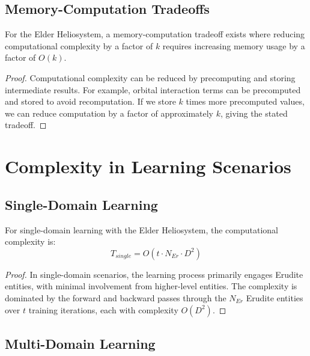 \subsection{Memory-Computation Tradeoffs}

\begin{theorem}
For the Elder Heliosystem, a memory-computation tradeoff exists where reducing computational complexity by a factor of $k$ requires increasing memory usage by a factor of $O(k)$.
\end{theorem}

\begin{proof}
Computational complexity can be reduced by precomputing and storing intermediate results. For example, orbital interaction terms can be precomputed and stored to avoid recomputation. If we store $k$ times more precomputed values, we can reduce computation by a factor of approximately $k$, giving the stated tradeoff.
\end{proof}

\section{Complexity in Learning Scenarios}

\subsection{Single-Domain Learning}

\begin{theorem}
For single-domain learning with the Elder Heliosystem, the computational complexity is:
\begin{equation}
T_{single} = O(t \cdot N_{Er} \cdot D^2)
\end{equation}
\end{theorem}

\begin{proof}
In single-domain scenarios, the learning process primarily engages Erudite entities, with minimal involvement from higher-level entities. The complexity is dominated by the forward and backward passes through the $N_{Er}$ Erudite entities over $t$ training iterations, each with complexity $O(D^2)$.
\end{proof}

\subsection{Multi-Domain Learning}

